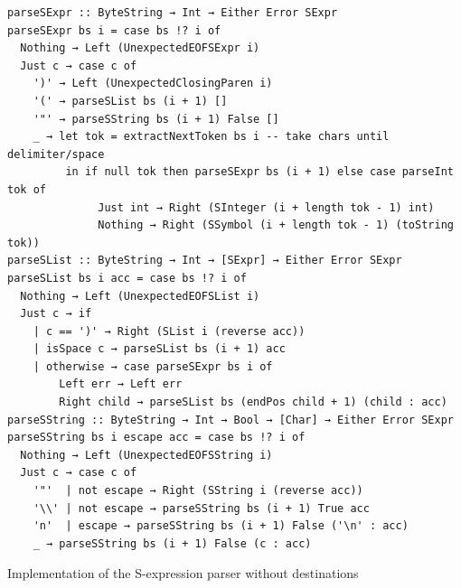 \documentclass[english]{jflart}
\begin{document}
\begin{table}[t]
\small
\begin{verbatim}
parseSExpr :: ByteString → Int → Either Error SExpr
parseSExpr bs i = case bs !? i of
  Nothing → Left (UnexpectedEOFSExpr i)
  Just c → case c of
    ')' → Left (UnexpectedClosingParen i)
    '(' → parseSList bs (i + 1) []
    '"' → parseSString bs (i + 1) False []
    _ → let tok = extractNextToken bs i -- take chars until delimiter/space
         in if null tok then parseSExpr bs (i + 1) else case parseInt tok of
              Just int → Right (SInteger (i + length tok - 1) int)
              Nothing → Right (SSymbol (i + length tok - 1) (toString tok))
parseSList :: ByteString → Int → [SExpr] → Either Error SExpr
parseSList bs i acc = case bs !? i of
  Nothing → Left (UnexpectedEOFSList i)
  Just c → if
    | c == ')' → Right (SList i (reverse acc))
    | isSpace c → parseSList bs (i + 1) acc
    | otherwise → case parseSExpr bs i of
        Left err → Left err
        Right child → parseSList bs (endPos child + 1) (child : acc)
parseSString :: ByteString → Int → Bool → [Char] → Either Error SExpr
parseSString bs i escape acc = case bs !? i of
  Nothing → Left (UnexpectedEOFSString i)
  Just c → case c of
    '"'  | not escape → Right (SString i (reverse acc))
    '\\' | not escape → parseSString bs (i + 1) True acc
    'n'  | escape → parseSString bs (i + 1) False ('\n' : acc)
    _ → parseSString bs (i + 1) False (c : acc)
\end{verbatim}
\caption{Implementation of the S-expression parser without destinations}
\label{table:impl-sexpr-parser-without-dest}
\end{table}
\end{document}
